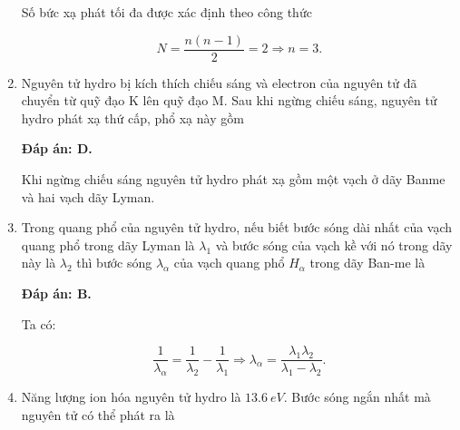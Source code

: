 \begin{enumerate}[label=\bfseries Câu \arabic*:]
{		Số bức xạ phát tối đa được xác định theo công thức 
		
		$$N = \dfrac{n(n-1)}{2} = 2\Rightarrow n =3.$$
	}	
	\item {}
		\cauhoi
	{ Nguyên tử hydro bị kích thích chiếu sáng và electron của nguyên tử đã chuyển từ quỹ đạo K lên quỹ đạo M. Sau khi ngừng chiếu sáng, nguyên tử hydro phát xạ thứ cấp, phổ xạ này gồm
		
		
	}
	
	\loigiai
	{		\textbf{Đáp án: D.}
		
		Khi ngừng chiếu sáng nguyên tử hydro phát xạ gồm một vạch ở dãy Banme và hai vạch dãy Lyman. 
	}	
	\item {}
		\cauhoi
	{ 
		Trong quang phổ của nguyên tử hydro, nếu biết bước sóng dài nhất của vạch quang phổ trong dãy Lyman là $\lambda_1$ và bước sóng của vạch kề với nó trong dãy này là $\lambda_2$ thì bước sóng $\lambda_\alpha$ của vạch quang phổ $H_\alpha$ trong dãy Ban-me là 
		
	}
	
	\loigiai
	{		\textbf{Đáp án: B.}
		
		Ta có:
		
		$$\dfrac{1}{\lambda_\alpha} = \dfrac{1}{\lambda_2} - \dfrac{1}{\lambda_1} \Rightarrow \lambda_\alpha = \dfrac{\lambda_1 \lambda_2}{\lambda_1 - \lambda_2}.$$
	}	
	\item {}
		\cauhoi
	{ Năng lượng ion hóa nguyên tử hydro là $\SI{13,6}{eV}$. Bước sóng ngắn nhất mà nguyên tử có thể phát ra là 
		
}
\end{enumerate}

